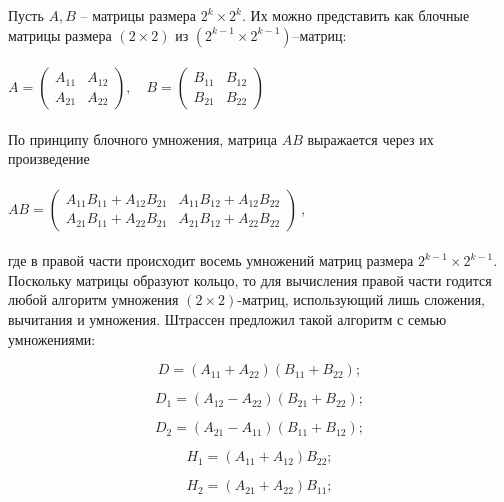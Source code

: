 Пусть $A,B$ – матрицы размера $2^k \times 2^k$. Их можно представить как блочные матрицы размера $(2 \times 2)$ из $(2^{k-1} \times 2^{k-1})$–матриц:
\\~\\
$ 
A =
\begin{pmatrix}
A_{11} & A_{12} \\
A_{21} & A_{22}
\end{pmatrix}, \quad
B =
\begin{pmatrix}
B_{11} & B_{12} \\
B_{21} & B_{22}
\end{pmatrix}
$
\\~\\
По принципу блочного умножения, матрица $AB$ выражается через их произведение
\\~\\
$
AB
=
\begin{pmatrix}
A_{11} B_{11} + A_{12} B_{21} &
A_{11} B_{12} + A_{12} B_{22} \\
A_{21} B_{11} + A_{22} B_{21} &
A_{21} B_{12} + A_{22} B_{22}
\end{pmatrix}\ ,
$
\\~\\
где в правой части происходит восемь умножений матриц размера $2^{k-1} \times 2^{k-1}$. Поскольку матрицы образуют кольцо, то для вычисления правой части годится любой алгоритм умножения $(2 \times 2)$-матриц, использующий лишь сложения, вычитания и умножения. Штрассен предложил такой алгоритм с семью умножениями:


\begin{equation}
D = (A_{11} + A_{22}) (B_{11} + B_{22});
\end{equation}


\begin{equation}
D_1 = (A_{12} - A_{22}) (B_{21} + B_{22});
\end{equation}


\begin{equation}
D_2 = (A_{21} - A_{11}) (B_{11} + B_{12});
\end{equation}


\begin{equation}
H_1 = (A_{11} + A_{12}) B_{22};
\end{equation}


\begin{equation}
H_2 = (A_{21} + A_{22}) B_{11};
\end{equation}


